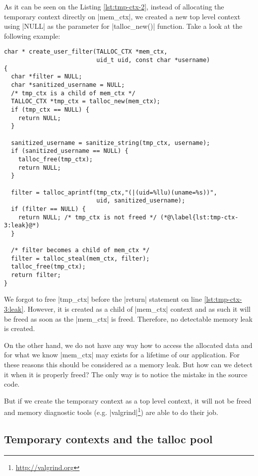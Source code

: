 As it can be seen on the Listing \ref{lst:tmp-ctx-2}, instead of allocating the
temporary context directly on |mem_ctx|, we created a new top level context
using |NULL| as the parameter for |talloc_new()| function. Take a look at the
following example:

\begin{lstlisting}[caption={Temporary context \#3},label=lst:tmp-ctx-3]
char * create_user_filter(TALLOC_CTX *mem_ctx,
                          uid_t uid, const char *username)
{
  char *filter = NULL;
  char *sanitized_username = NULL;
  /* tmp_ctx is a child of mem_ctx */
  TALLOC_CTX *tmp_ctx = talloc_new(mem_ctx);
  if (tmp_ctx == NULL) {
    return NULL;
  }
  
  sanitized_username = sanitize_string(tmp_ctx, username);
  if (sanitized_username == NULL) {
    talloc_free(tmp_ctx);
    return NULL;
  }
  
  filter = talloc_aprintf(tmp_ctx,"(|(uid=%llu)(uname=%s))",
                          uid, sanitized_username);
  if (filter == NULL) {
    return NULL; /* tmp_ctx is not freed */ (*@\label{lst:tmp-ctx-3:leak}@*)
  }
  
  /* filter becomes a child of mem_ctx */
  filter = talloc_steal(mem_ctx, filter);
  talloc_free(tmp_ctx);
  return filter;
}
\end{lstlisting}

We forgot to free |tmp_ctx| before the |return| statement on line
\ref{lst:tmp-ctx-3:leak}. However, it is created as a child of |mem_ctx| context
and as such it will be freed as soon as the |mem_ctx| is freed. Therefore, no
detectable memory leak is created.

On the other hand, we do not have any way how to access the allocated data
and for what we know |mem_ctx| may exists for a lifetime of our application.
For these reasons this should be considered as a memory leak. But how can we
detect it when it is properly freed? The only way is to notice the mistake in
the source code.

But if we create the temporary context as a top level context, it will not be
freed and memory diagnostic tools
(e.g. |valgrind|\footnote{\url{http://valgrind.org}}) are able to do their job.

\subsection{Temporary contexts and the talloc pool}
\label{talloc:subsec:tmp-ctx-and-pool}

